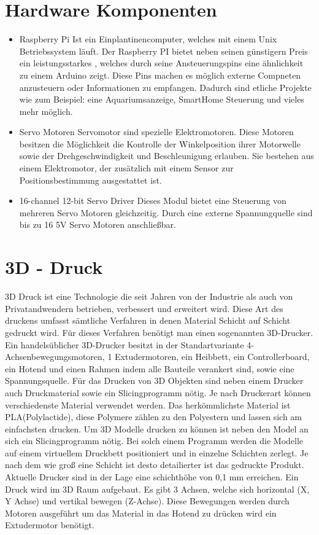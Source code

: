 \documentclass[12pt,					%
							 oneside,			%
							 a4paper,			%
							 halfparskip,		%
							 liststotoc,			%
							 bibtotoc,			%
							 fleqn,				%
							 pointlessnumbers]	%
							 {scrreprt}
\begin{document}
\section{Hardware Komponenten}
\begin{itemize}
\item Raspberry Pi
	Ist ein Einplantinencomputer, welches mit einem Unix Betriebssystem läuft. Der Raspberry PI bietet neben seinen günstigern Preis ein leistungsstarkes , welches durch seine Ansteuerungspins eine ähnlichkeit zu einem Arduino zeigt. Diese Pins machen es möglich externe Compneten anzusteuern oder Informationen zu empfangen. Dadurch sind etliche Projekte wie zum Beispiel: eine Aquariumsanzeige, SmartHome Steuerung und vieles mehr möglich.
\item Servo Motoren
	Servomotor sind spezielle Elektromotoren. Diese Motoren besitzen die Möglichkeit die Kontrolle der Winkelposition ihrer Motorwelle sowie der Drehgeschwindigkeit und Beschleunigung erlauben. Sie bestehen aus einem Elektromotor, der zusätzlich mit einem Sensor zur Positionsbestimmung ausgestattet ist.
\item 16-channel 12-bit Servo Driver
	Dieses Modul bietet eine Steuerung von mehreren Servo Motoren gleichzeitig. Durch eine externe Spannungquelle sind bis zu 16 5V Servo Motoren anschließbar.
\end{itemize}

\section{3D - Druck}
3D Druck ist eine Technologie die seit Jahren von der Industrie als auch von Privatandwendern betrieben, verbessert und erweitert wird. Diese Art des druckens umfasst sämtliche Verfahren in denen Material Schicht auf Schicht gedruckt wird.
Für dieses Verfahren benötigt man einen sogenannten 3D-Drucker. Ein handelsüblicher 3D-Drucker besitzt in der Standartvariante 4-Achsenbewegungsmotoren, 1 Extudermotoren, ein Heibbett, ein Controllerboard, ein Hotend und einen Rahmen indem alle Bauteile verankert sind, sowie eine Spannungsquelle.
Für das Drucken von 3D Objekten sind neben einem Drucker auch Druckmaterial sowie ein Slicingprogramm nötig. Je nach Druckerart können verschiedenste Material verwendet werden. Das herkömmlichste Material ist PLA(Polylactide), diese Polymere zählen zu den Polyestern und lassen sich am einfachsten drucken.
Um 3D Modelle drucken zu können ist neben den Model an sich ein Slicingprogramm nötig. Bei solch einem Programm werden die Modelle auf einem virtuellem Druckbett positioniert und in einzelne Schichten zerlegt. Je nach dem wie groß eine Schicht ist desto detailierter ist das gedruckte Produkt. Aktuelle Drucker sind in der Lage eine schichthöhe von 0,1 mm erreichen.
Ein Druck wird im 3D Raum aufgebaut. Es gibt 3 Achsen, welche sich horizontal (X, Y Achse) und vertikal bewegen (Z-Achse). Diese Bewegungen werden durch Motoren ausgeführt um das Material in das Hotend zu drücken wird ein Extudermotor benötigt.
\end{document}
